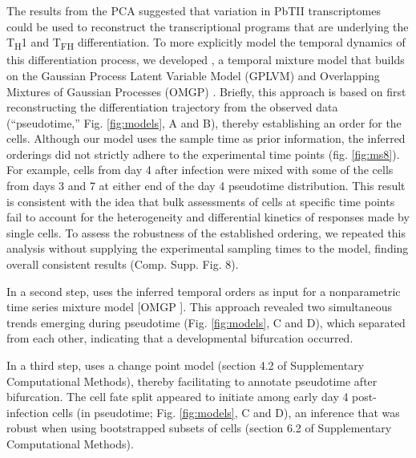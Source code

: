The results from the PCA suggested that variation in PbTII transcriptomes could be used to reconstruct the transcriptional programs that are underlying the T\textsubscript{H}1 and T\textsubscript{FH} differentiation. To more explicitly model the temporal dynamics of this differentiation process, we developed , a temporal mixture model that builds on the Gaussian Process Latent Variable Model (GPLVM) \cite{Lawrence2006-it} and Overlapping Mixtures of Gaussian Processes (OMGP) \cite{Lazaro-Gredilla2012-ta}. Briefly, this approach is based on first reconstructing the differentiation trajectory from the observed data (“pseudotime,” Fig. \ref{fig:models}, A and B), thereby establishing an order for the cells. Although our model uses the sample time as prior information, the inferred orderings did not strictly adhere to the experimental time points (fig. \ref{fig:ms8}). For example, cells from day 4 after infection were mixed with some of the cells from days 3 and 7 at either end of the day 4 pseudotime distribution. This result is consistent with the idea that bulk assessments of cells at specific time points fail to account for the heterogeneity and differential kinetics of responses made by single cells. To assess the robustness of the established ordering, we repeated this analysis without supplying the experimental sampling times to the model, finding overall consistent results (Comp. Supp. Fig. 8).

In a second step,  uses the inferred temporal orders as input for a nonparametric time series mixture model [OMGP \cite{Lazaro-Gredilla2012-ta}]. This approach revealed two simultaneous trends emerging during pseudotime (Fig. \ref{fig:models}, C and D), which separated from each other, indicating that a developmental bifurcation occurred.

In a third step,  uses a change point model (section 4.2 of Supplementary Computational Methods), thereby facilitating to annotate pseudotime after bifurcation. The cell fate split appeared to initiate among early day 4 post-infection cells (in pseudotime; Fig. \ref{fig:models}, C and D), an inference that was robust when using bootstrapped subsets of cells (section 6.2 of Supplementary Computational Methods).

